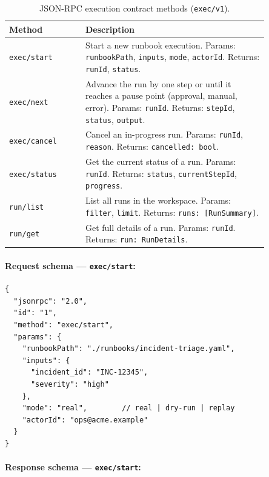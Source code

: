 \begin{table}[ht]
\centering
\begin{tabular}{p{0.25\linewidth}p{0.60\linewidth}}
\hline
\textbf{Method} & \textbf{Description} \\
\hline
\texttt{exec/start} &
Start a new runbook execution.  Params: \texttt{runbookPath}, \texttt{inputs},
\texttt{mode}, \texttt{actorId}.  Returns: \texttt{runId}, \texttt{status}. \\
\hline
\texttt{exec/next} &
Advance the run by one step or until it reaches a pause point (approval,
manual, error).  Params: \texttt{runId}.  Returns: \texttt{stepId},
\texttt{status}, \texttt{output}. \\
\hline
\texttt{exec/cancel} &
Cancel an in-progress run.  Params: \texttt{runId}, \texttt{reason}.  Returns:
\texttt{cancelled: bool}. \\
\hline
\texttt{exec/status} &
Get the current status of a run.  Params: \texttt{runId}.  Returns:
\texttt{status}, \texttt{currentStepId}, \texttt{progress}. \\
\hline
\texttt{run/list} &
List all runs in the workspace.  Params: \texttt{filter}, \texttt{limit}.
Returns: \texttt{runs: [RunSummary]}. \\
\hline
\texttt{run/get} &
Get full details of a run.  Params: \texttt{runId}.  Returns: \texttt{run:
RunDetails}. \\
\hline
\end{tabular}
\caption{JSON-RPC execution contract methods (\texttt{exec/v1}).}
\label{tab:exec-methods}
\end{table}

\paragraph{Request schema — \texttt{exec/start}:}

\begin{verbatim}
{
  "jsonrpc": "2.0",
  "id": "1",
  "method": "exec/start",
  "params": {
    "runbookPath": "./runbooks/incident-triage.yaml",
    "inputs": {
      "incident_id": "INC-12345",
      "severity": "high"
    },
    "mode": "real",        // real | dry-run | replay
    "actorId": "ops@acme.example"
  }
}
\end{verbatim}

\paragraph{Response schema — \texttt{exec/start}:}

